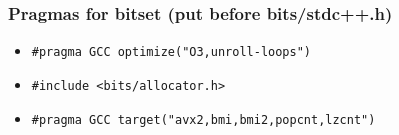 	\subsubsection{Pragmas for bitset (put before bits/stdc++.h)}
		\begin{itemize}
			\item \lstinline{#pragma GCC optimize("O3,unroll-loops")}
			\item \lstinline{#include <bits/allocator.h>}
			\item \lstinline{#pragma GCC target("avx2,bmi,bmi2,popcnt,lzcnt")}
		\end{itemize}
